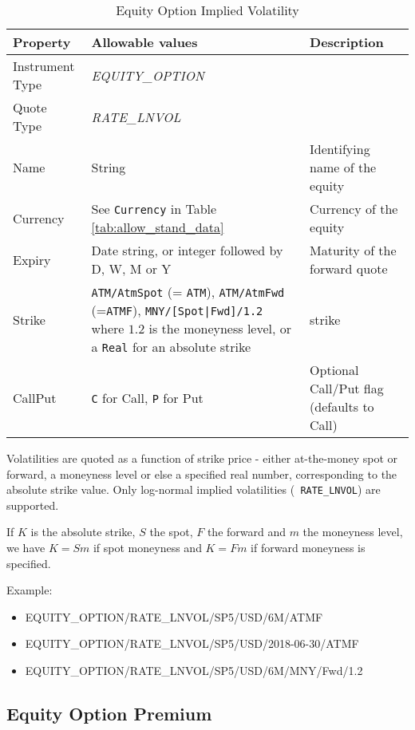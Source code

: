 \begin{table}[H]
	\centering
	\begin{tabular}{|p{3cm}|p{5.5cm}|p{5cm}|}
		\hline
		{\bf Property} & {\bf Allowable values} & {\bf Description} \\ \hline
        Instrument Type & \emph{EQUITY\_OPTION} & \\ \hline
        Quote Type & \emph{RATE\_LNVOL} & \\ \hline
        Name & String & Identifying name of the equity \\ \hline
        Currency & See \lstinline!Currency! in Table \ref{tab:allow_stand_data}&  Currency of the equity \\ \hline
        Expiry & Date string, or integer followed by D, W, M or Y & Maturity of the forward quote \\ \hline
        Strike & {\tt ATM/AtmSpot} (= {\tt ATM}), {\tt ATM/AtmFwd} (={\tt ATMF}), {\tt MNY/[Spot|Fwd]/1.2} where $1.2$
                 is the moneyness level, or a {\tt Real} for an absolute strike & strike \\ \hline
        CallPut & {\tt C} for Call, {\tt P} for Put & Optional Call/Put flag (defaults to Call) \\ \hline
	\end{tabular}
	\caption{Equity Option Implied Volatility}
	\label{tab:eqimplvol_quote}
\end{table}

Volatilities are quoted as a function of strike price - either at-the-money spot or forward, a moneyness level or else a
specified real number, corresponding to the absolute strike value. Only log-normal implied volatilities ({\tt
  RATE\_LNVOL}) are supported.

If $K$ is the absolute strike, $S$ the spot, $F$ the forward and $m$ the moneyness level, we have $K=Sm$ if spot
moneyness and $K=Fm$ if forward moneyness is specified.

\medskip
Example:
\begin{itemize}
	\item {EQUITY\_OPTION/RATE\_LNVOL/SP5/USD/6M/ATMF}
	\item {EQUITY\_OPTION/RATE\_LNVOL/SP5/USD/2018-06-30/ATMF}
	\item {EQUITY\_OPTION/RATE\_LNVOL/SP5/USD/6M/MNY/Fwd/1.2}
\end{itemize}

\subsection{Equity Option Premium}
\label{md:equity_option_premium}

